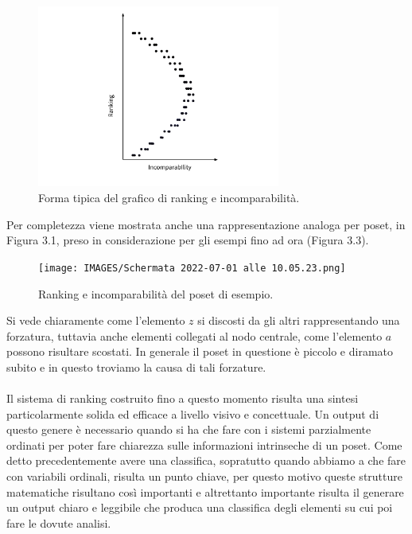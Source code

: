 \documentclass{report}
\begin{document}
\begin{figure}[H]
    \centering
    \includegraphics[width=8cm]{IMAGES/image ranking.png}
    \caption{Forma tipica del grafico di ranking e incomparabilità.}
    \label{fig:roc}
\end{figure}

Per completezza viene mostrata anche una rappresentazione analoga per poset, in Figura 3.1, preso in considerazione per gli esempi fino ad ora (Figura 3.3).

\begin{figure}[H]
    \centering
    \texttt{[image: IMAGES/Schermata 2022-07-01 alle 10.05.23.png]}
    \caption{Ranking e incomparabilità del poset di esempio.}
    \label{fig:roc}
\end{figure}

Si vede chiaramente come l'elemento $z$ si discosti da gli altri rappresentando una forzatura, tuttavia anche elementi collegati al nodo centrale, come l'elemento $a$ possono risultare scostati. In generale il poset in questione è piccolo e diramato subito e in questo troviamo la causa di tali forzature.
\\~\\
Il sistema di ranking costruito fino a questo momento risulta una sintesi particolarmente solida ed efficace a livello visivo e concettuale. Un output di questo genere è necessario quando si ha che fare con i sistemi parzialmente ordinati per poter fare chiarezza sulle informazioni intrinseche di un poset. Come detto precedentemente avere una classifica, sopratutto quando abbiamo a che fare con variabili ordinali, risulta un punto chiave, per questo motivo queste strutture matematiche risultano così importanti e altrettanto importante risulta il generare un output chiaro e leggibile che produca una classifica degli elementi su cui poi fare le dovute analisi.
\end{document}

